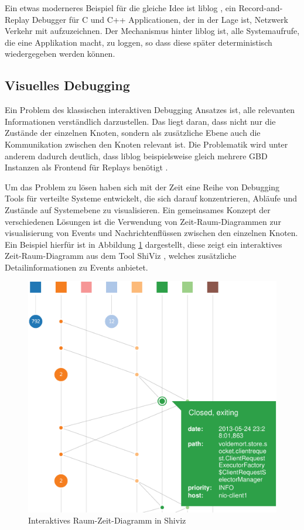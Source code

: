 \documentclass[12pt,a4paper]{report}
\begin{document}
Ein etwas moderneres Beispiel für die gleiche Idee ist liblog \cite{distributed_replay_debugging_2006}, ein Record-and-Replay Debugger für
C und C++ Applicationen, der in der Lage ist, Netzwerk Verkehr mit aufzuzeichnen. Der Mechanismus hinter liblog ist, alle
Systemaufrufe, die eine Applikation macht, zu loggen, so dass diese später deterministisch wiedergegeben werden können.

\subsection{Visuelles Debugging}
Ein Problem des klassischen interaktiven Debugging Ansatzes ist, alle relevanten Informationen verständlich darzustellen. Das
liegt daran, dass nicht nur die Zustände der einzelnen Knoten, sondern als zusätzliche Ebene auch die Kommunikation
zwischen den Knoten relevant ist. Die Problematik wird unter anderem dadurch deutlich, dass liblog beispielsweise gleich mehrere
GBD Instanzen als Frontend für Replays benötigt \cite{distributed_replay_debugging_2006}.

Um das Problem zu lösen haben sich mit der Zeit eine Reihe von Debugging Tools für verteilte Systeme entwickelt, die sich darauf
konzentrieren, Abläufe und Zustände auf Systemebene zu visualisieren. Ein gemeinsames Konzept der verschiedenen Lösungen ist die
Verwendung von Zeit-Raum-Diagrammen zur visualisierung von Events und Nachrichtenflüssen zwischen den einzelnen Knoten. Ein
Beispiel hierfür ist in Abbildung \ref{fig:shiviz} dargestellt, diese zeigt ein interaktives Zeit-Raum-Diagramm aus dem Tool
ShiViz \cite{ShiViz_visual_debugger}, welches zusätzliche Detailinformationen zu Events anbietet.

\begin{figure}[H]
	\centering
	\includegraphics[width=\linewidth]{img/shiviz_time_space.pdf}
	\caption{Interaktives Raum-Zeit-Diagramm in Shiviz \cite{ShiViz_visual_debugger}}
	\label{fig:shiviz}
\end{figure}
\end{document}
